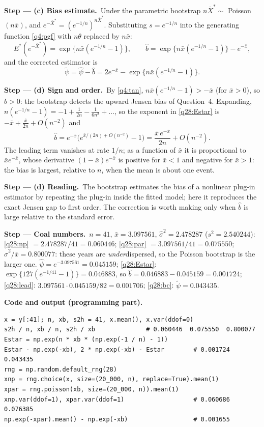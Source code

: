 \documentclass[11pt,a4paper]{article}
\numberwithin{equation}{questao}   %
\newcommand{\passo}[2]{\par\smallskip\noindent\textbf{Step --- #1.}~#2}
\newcommand{\codehead}{\par\smallskip\noindent\textbf{Code and output (programming part).}\par}
\newcommand{\1}{\mathbf{1}}
\begin{document}
\begin{sol}
\passo{(c) Bias estimate}{Under the parametric bootstrap $n\overline X^*\sim$ Poisson$(n\bar x)$, and
$e^{-\overline X^*}=(e^{-1/n})^{n\overline X^*}$. Substituting $s=e^{-1/n}$ into the generating
function \eqref{q4:pgf} with $n\theta$ replaced by $n\bar x$:}
\begin{equation}\label{q28:Estar}
E^*(e^{-\overline X^*})=\exp\{n\bar x(e^{-1/n}-1)\},\qquad
\hat b=\exp\{n\bar x(e^{-1/n}-1)\}-e^{-\bar x},
\end{equation}
and the corrected estimator is
\begin{equation}\label{q28:bc}
\tilde\psi=\hat\psi-\hat b=2e^{-\bar x}-\exp\{n\bar x(e^{-1/n}-1)\}.
\end{equation}

\passo{(d) Sign and order}{By \eqref{q4:tan}, $n\bar x(e^{-1/n}-1)>-\bar x$ (for $\bar x>0$), so
$\hat b>0$: the bootstrap detects the upward Jensen bias of Question~4. Expanding,
$n(e^{-1/n}-1)=-1+\frac1{2n}-\frac1{6n^2}+\dots$, so the exponent in \eqref{q28:Estar} is
$-\bar x+\frac{\bar x}{2n}+O(n^{-2})$ and}
\begin{equation}\label{q28:lead}
\hat b=e^{-\bar x}\Big(e^{\bar x/(2n)+O(n^{-2})}-1\Big)=\frac{\bar x\,e^{-\bar x}}{2n}+O(n^{-2}).
\end{equation}
The leading term vanishes at rate $1/n$; as a function of $\bar x$ it is proportional to
$\bar xe^{-\bar x}$, whose derivative $(1-\bar x)e^{-\bar x}$ is positive for $\bar x<1$ and negative
for $\bar x>1$: the bias is largest, relative to $n$, when the mean is about one event.

\passo{(d) Reading}{The bootstrap estimates the bias of a nonlinear plug-in estimator by repeating
the plug-in inside the fitted model; here it reproduces the exact Jensen gap to first order. The
correction is worth making only when $\hat b$ is large relative to the standard error.}

\passo{Coal numbers}{$n=41$, $\bar x=3.097561$, $\hat\sigma^2=2.478287$ ($s^2=2.540244$):
\eqref{q28:np} $=2.478287/41=0.060446$; \eqref{q28:par} $=3.097561/41=0.075550$; $\hat\sigma^2/\bar x=0.800077$:
these years are \emph{under}dispersed, so the Poisson bootstrap is the larger one.
$\hat\psi=e^{-3.097561}=0.045159$; \eqref{q28:Estar}: $\exp\{127(e^{-1/41}-1)\}=0.046883$, so
$\hat b=0.046883-0.045159=0.001724$; \eqref{q28:lead}: $3.097561\cdot0.045159/82=0.001706$;
\eqref{q28:bc}: $\tilde\psi=0.043435$.}

\codehead
{\small
\begin{verbatim}
x = y[:41]; n, xb, s2h = 41, x.mean(), x.var(ddof=0)
s2h / n, xb / n, s2h / xb              # 0.060446  0.075550  0.800077
Estar = np.exp(n * xb * (np.exp(-1 / n) - 1))
Estar - np.exp(-xb), 2 * np.exp(-xb) - Estar        # 0.001724  0.043435
rng = np.random.default_rng(28)
xnp = rng.choice(x, size=(20_000, n), replace=True).mean(1)
xpar = rng.poisson(xb, size=(20_000, n)).mean(1)
xnp.var(ddof=1), xpar.var(ddof=1)                   # 0.060686  0.076385
np.exp(-xpar).mean() - np.exp(-xb)                  # 0.001655
\end{verbatim}
}


\end{sol}
\end{document}
